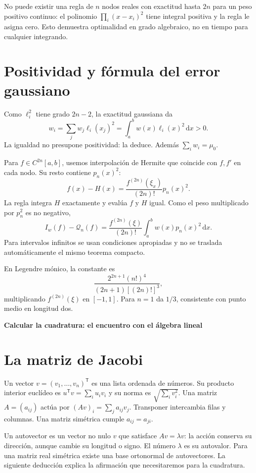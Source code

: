 \documentclass[11pt,a4paper]{article}
\newcommand{\dd}{\,\mathrm d}
\theoremstyle{definition}
\newcommand{\parte}[1]{\par\bigskip\Needspace{8\baselineskip}\begin{center}{\Large\bfseries\color{azul}#1}\end{center}}
\begin{document}
No puede existir una regla de $n$ nodos reales con exactitud hasta $2n$ para un peso positivo continuo: el polinomio $\prod_i(x-x_i)^2$ tiene integral positiva y la regla le asigna cero. Esto demuestra optimalidad en grado algebraico, no en tiempo para cualquier integrando.

\section{Positividad y fórmula del error gaussiano}
Como $\ell_i^2$ tiene grado $2n-2$, la exactitud gaussiana da
\[
w_i=\sum_jw_j\ell_i(x_j)^2=\int_a^b w(x)\ell_i(x)^2\dd x>0.
\]
La igualdad no presupone positividad: la deduce. Además $\sum_iw_i=\mu_0$.

Para $f\in C^{2n}[a,b]$, usemos interpolación de Hermite que coincide con $f,f'$ en cada nodo. Su resto contiene $p_n(x)^2$:
\[
f(x)-H(x)=\frac{f^{(2n)}(\xi_x)}{(2n)!}p_n(x)^2.
\]
La regla integra $H$ exactamente y evalúa $f$ y $H$ igual. Como el peso multiplicado por $p_n^2$ es no negativo,
\[
I_w(f)-\mathcal Q_n(f)=
\frac{f^{(2n)}(\xi)}{(2n)!}\int_a^b w(x)p_n(x)^2\dd x.
\]
Para intervalos infinitos se usan condiciones apropiadas y no se traslada automáticamente el mismo teorema compacto.

En Legendre mónico, la constante es
\[
\frac{2^{2n+1}(n!)^4}{(2n+1)[(2n)!]^3},
\]
multiplicando $f^{(2n)}(\xi)$ en $[-1,1]$. Para $n=1$ da $1/3$, consistente con punto medio en longitud dos.



\parte{Calcular la cuadratura: el encuentro con el álgebra lineal}
\section{La matriz de Jacobi}

Un vector $v=(v_1,\ldots,v_n)^{\mathsf T}$ es una lista ordenada de números. Su producto interior euclídeo es $u^{\mathsf T}v=\sum_i u_iv_i$ y su norma es $\sqrt{\sum_i v_i^2}$. Una matriz $A=(a_{ij})$ actúa por $(Av)_i=\sum_j a_{ij}v_j$. Transponer intercambia filas y columnas. Una matriz simétrica cumple $a_{ij}=a_{ji}$.

Un autovector es un vector no nulo $v$ que satisface $Av=\lambda v$: la acción conserva su dirección, aunque cambie su longitud o signo. El número $\lambda$ es su autovalor. Para una matriz real simétrica existe una base ortonormal de autovectores. La siguiente deducción explica la afirmación que necesitaremos para la cuadratura.
\end{document}
